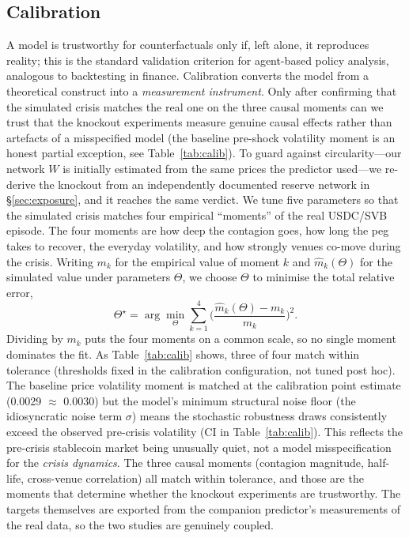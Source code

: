\documentclass[sigconf,anonymous]{acmart}
\begin{document}
\subsection{Calibration}
A model is trustworthy for counterfactuals only if, left alone, it reproduces
reality; this is the standard validation criterion for agent-based policy analysis,
analogous to backtesting in finance. Calibration converts the model from a theoretical
construct into a \emph{measurement instrument}. Only after confirming that the simulated crisis matches the real one
on the three causal moments can we trust that the knockout experiments measure genuine
causal effects rather than artefacts of a misspecified model (the baseline pre-shock
volatility moment is an honest partial exception, see Table~\ref{tab:calib}). To guard
against circularity---our network $W$ is initially estimated from the same prices the
predictor used---we re-derive the knockout from an independently documented reserve network
in \S\ref{sec:exposure}, and it reaches the same verdict.
We tune five
parameters so that the simulated crisis matches four empirical ``moments'' of the real USDC/SVB
episode. The four moments are how deep the contagion goes, how long the peg takes to recover, the
everyday volatility, and how strongly venues co-move during the crisis. Writing $m_k$ for the
empirical value of moment $k$ and $\hat m_k(\Theta)$ for the simulated value under parameters
$\Theta$, we choose $\Theta$ to minimise the total relative error,
\begin{equation}
\Theta^\star=\arg\min_{\Theta}\sum_{k=1}^{4}\Big(\frac{\hat m_k(\Theta)-m_k}{m_k}\Big)^2 .
\end{equation}
Dividing by $m_k$ puts the four moments on a common scale, so no single moment dominates the fit. As
Table~\ref{tab:calib} shows, three of four match within tolerance (thresholds fixed in the
calibration configuration, not tuned post hoc). The baseline price volatility
moment is matched at the calibration point estimate (0.0029 $\approx$ 0.0030) but the model's
minimum structural noise floor (the idiosyncratic noise term $\sigma$) means the stochastic
robustness draws consistently exceed the observed pre-crisis volatility (CI in
Table~\ref{tab:calib}). This reflects the pre-crisis stablecoin
market being unusually quiet, not a model misspecification for the \emph{crisis dynamics}. The
three causal moments (contagion magnitude, half-life, cross-venue correlation) all match within
tolerance, and those are the moments that determine whether the knockout experiments are trustworthy.
The targets themselves are exported
from the companion predictor's measurements of the real data, so the two studies are genuinely coupled.
\end{document}
